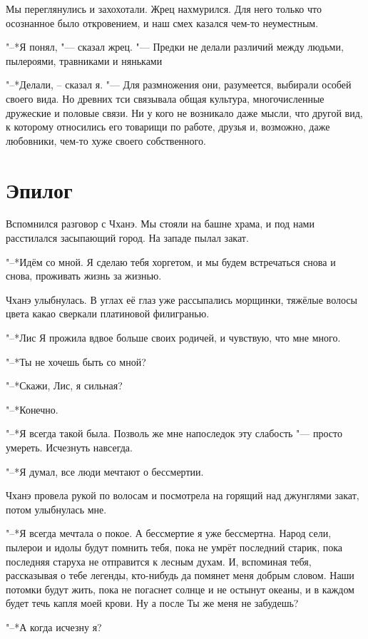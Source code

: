 \documentclass[a4paper,10pt]{book}
\newcommand{\ldotst}{\so{...}\xspace}
\begin{document}
Мы переглянулись и захохотали. Жрец нахмурился. Для него только что
осознанное было откровением, и наш смех казался чем-то неуместным.

"--*Я понял, "--- сказал жрец. "--- Предки не делали различий между людьми, 
пылероями, травниками и няньками\ldotst

"--*Делали, -- сказал я. "--- Для размножения они, разумеется, выбирали особей 
своего вида. Но древних тси связывала общая культура, многочисленные дружеские 
и половые связи. Ни у кого не возникало даже мысли, что другой вид, к которому 
относились его товарищи по работе, друзья и, возможно, даже любовники, чем-то 
хуже своего собственного.

\section{Эпилог}

Вспомнился разговор с Чханэ. Мы стояли на башне храма, и под нами расстилался 
засыпающий город. На западе пылал закат.

"--*Идём со мной. Я сделаю тебя хоргетом, и мы будем встречаться снова и снова, 
проживать жизнь за жизнью.

Чханэ улыбнулась. В углах её глаз уже рассыпались морщинки, тяжёлые волосы 
цвета 
какао сверкали платиновой филигранью.

"--*Лис\ldotst Я прожила вдвое больше своих родичей, и чувствую, что мне\ldotst 
много.

"--*Ты не хочешь быть со мной?

"--*Скажи, Лис, я сильная?

"--*Конечно.

"--*Я всегда такой была. Позволь же мне напоследок эту слабость "--- просто 
умереть. 
Исчезнуть навсегда.

"--*Я думал, все люди мечтают о бессмертии.

Чханэ провела рукой по волосам и посмотрела на горящий над джунглями закат, 
потом улыбнулась мне.

"--*Я всегда мечтала о покое. А бессмертие\ldotst я уже бессмертна. Народ сели, 
пылерои 
и идолы будут помнить тебя, пока не умрёт последний старик, пока последняя 
старуха не отправится к лесным духам. И, вспоминая тебя, рассказывая о тебе 
легенды, кто-нибудь да помянет меня добрым словом. Наши потомки будут жить, 
пока 
не погаснет солнце и не остынут океаны, и в каждом будет течь капля моей крови. 
Ну а после\ldotst Ты же меня не забудешь?

"--*А когда исчезну я?
\end{document}

